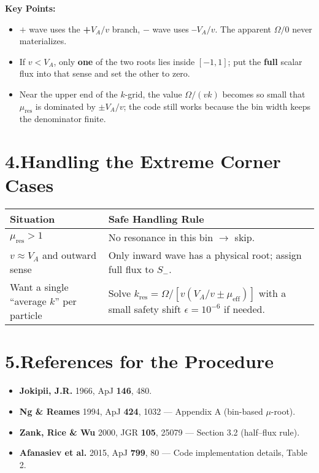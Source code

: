 \textbf{Key Points:}
\begin{itemize}
\item $+$ wave uses the \textbf{+$V_A/v$} branch, $-$ wave uses \textbf{--$V_A/v$}.
The apparent $\Omega/0$ never materializes.
\item If $v < V_A$, only \textbf{one} of the two roots lies inside $[-1, 1]$; put the \textbf{full} scalar flux into that sense and set the other to zero.
\item Near the upper end of the $k$-grid, the value $\Omega/(v k)$ becomes so small that $\mu_{\text{res}}$ is dominated by $\pm V_A/v$; the code still works because the bin width keeps the denominator finite.
\end{itemize}

\section*{4.\quad Handling the Extreme Corner Cases}

\begin{table}[h!]
\centering
\begin{tabular}{|p{5cm}|p{9cm}|}
\hline
\textbf{Situation} & \textbf{Safe Handling Rule} \\
\hline
$\mu_{\text{res}} > 1$ & No resonance in this bin $\rightarrow$ skip. \\
\hline
$v \approx V_A$ and outward sense & Only inward wave has a physical root; assign full flux to $S_{-}$. \\
\hline
Want a single ``average $k$'' per particle & Solve $k_{\text{res}} = \Omega / \left[v (V_A/v \pm \mu_{\text{eff}})\right]$ with a small safety shift $\epsilon = 10^{-6}$ if needed. \\
\hline
\end{tabular}
\end{table}

\section*{5.\quad References for the Procedure}

\begin{itemize}
\item \textbf{Jokipii, J.R.} 1966, ApJ \textbf{146}, 480.
\item \textbf{Ng \& Reames} 1994, ApJ \textbf{424}, 1032 --- Appendix A (bin-based $\mu$-root).
\item \textbf{Zank, Rice \& Wu} 2000, JGR \textbf{105}, 25079 --- Section 3.2 (half--flux rule).
\item \textbf{Afanasiev et al.} 2015, ApJ \textbf{799}, 80 --- Code implementation details, Table 2.
\end{itemize}

